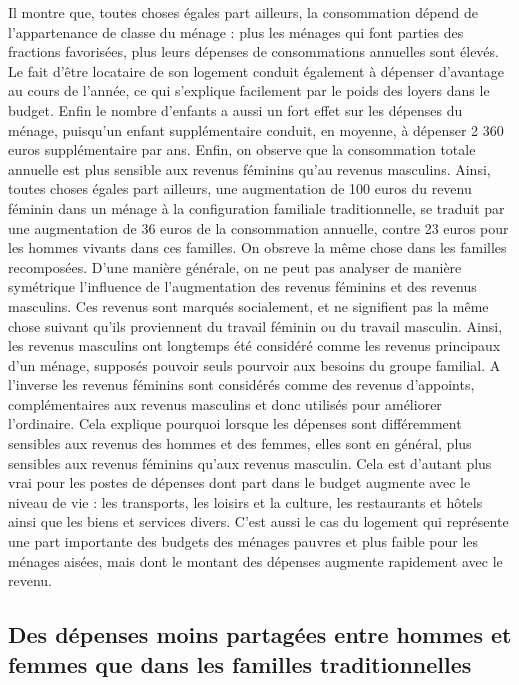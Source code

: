 \documentclass[
  12pt,
]{book}
\begin{document}
Il montre que, toutes choses égales part ailleurs, la consommation
dépend de l'appartenance de classe du ménage : plus les ménages qui font
parties des fractions favorisées, plus leurs dépenses de consommations
annuelles sont élevés. Le fait d'être locataire de son logement conduit
également à dépenser d'avantage au cours de l'année, ce qui s'explique
facilement par le poids des loyers dans le budget. Enfin le nombre
d'enfants a aussi un fort effet sur les dépenses du ménage, puisqu'un
enfant supplémentaire conduit, en moyenne, à dépenser 2 360 euros
supplémentaire par ans. Enfin, on observe que la consommation totale
annuelle est plus sensible aux revenus féminins qu'au revenus masculins.
Ainsi, toutes choses égales part ailleurs, une augmentation de 100 euros
du revenu féminin dans un ménage à la configuration familiale
traditionnelle, se traduit par une augmentation de 36 euros de la
consommation annuelle, contre 23 euros pour les hommes vivants dans ces
familles. On obsreve la même chose dans les familles recomposées. D'une
manière générale, on ne peut pas analyser de manière symétrique
l'influence de l'augmentation des revenus féminins et des revenus
masculins. Ces revenus sont marqués socialement, et ne signifient pas la
même chose suivant qu'ils proviennent du travail féminin ou du travail
masculin. Ainsi, les revenus masculins ont longtemps été considéré comme
les revenus principaux d'un ménage, supposés pouvoir seuls pourvoir aux
besoins du groupe familial. A l'inverse les revenus féminins sont
considérés comme des revenus d'appoints, complémentaires aux revenus
masculins et donc utilisés pour améliorer l'ordinaire. Cela explique
pourquoi lorsque les dépenses sont différemment sensibles aux revenus
des hommes et des femmes, elles sont en général, plus sensibles aux
revenus féminins qu'aux revenus masculin. Cela est d'autant plus vrai
pour les postes de dépenses dont part dans le budget augmente avec le
niveau de vie : les transports, les loisirs et la culture, les
restaurants et hôtels ainsi que les biens et services divers. C'est
aussi le cas du logement qui représente une part importante des budgets
des ménages pauvres et plus faible pour les ménages aisées, mais dont le
montant des dépenses augmente rapidement avec le revenu.

\subsection{Des dépenses moins partagées entre hommes et femmes que dans
les familles
traditionnelles}\label{des-duxe9penses-moins-partaguxe9es-entre-hommes-et-femmes-que-dans-les-familles-traditionnelles}
\end{document}
